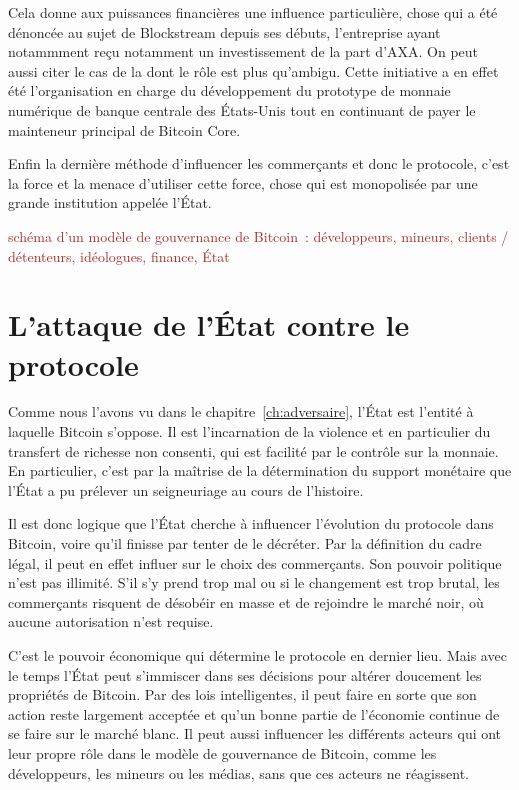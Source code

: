 %
Cela donne aux puissances financières une influence particulière, chose qui a été dénoncée au sujet de Blockstream depuis ses débuts, l'entreprise ayant notammment reçu notamment un investissement de la part d'AXA. On peut aussi citer le cas de la  dont le rôle est plus qu'ambigu. Cette initiative a en effet été l'organisation en charge du développement du prototype de monnaie numérique de banque centrale des États-Unis tout en continuant de payer le mainteneur principal de Bitcoin Core.


Enfin la dernière méthode d'influencer les commerçants et donc le protocole, c'est la force et la menace d'utiliser cette force, chose qui est monopolisée par une grande institution appelée l'État.

\textcolor{brown}{schéma d'un modèle de gouvernance de Bitcoin~: développeurs, mineurs, clients / détenteurs, idéologues, finance, État}

\section*{L'attaque de l'État contre le protocole} %

Comme nous l'avons vu dans le chapitre~\ref{ch:adversaire}, l'État est l'entité à laquelle Bitcoin s'oppose. Il est l'incarnation de la violence et en particulier du transfert de richesse non consenti, qui est facilité par le contrôle sur la monnaie. En particulier, c'est par la maîtrise de la détermination du support monétaire que l'État a pu prélever un seigneuriage au cours de l'histoire.

Il est donc logique que l'État cherche à influencer l'évolution du protocole dans Bitcoin, voire qu'il finisse par tenter de le décréter. Par la définition du cadre légal, il peut en effet influer sur le choix des commerçants. Son pouvoir politique n'est pas illimité. S'il s'y prend trop mal ou si le changement est trop brutal, les commerçants risquent de désobéir en masse et de rejoindre le marché noir, où aucune autorisation n'est requise.

C'est le pouvoir économique qui détermine le protocole en dernier lieu. Mais avec le temps l'État peut s'immiscer dans ses décisions pour altérer doucement les propriétés de Bitcoin. Par des lois intelligentes, il peut faire en sorte que son action reste largement acceptée et qu'un bonne partie de l'économie continue de se faire sur le marché blanc. Il peut aussi influencer les différents acteurs qui ont leur propre rôle dans le modèle de gouvernance de Bitcoin, comme les développeurs, les mineurs ou les médias, sans que ces acteurs ne réagissent.

